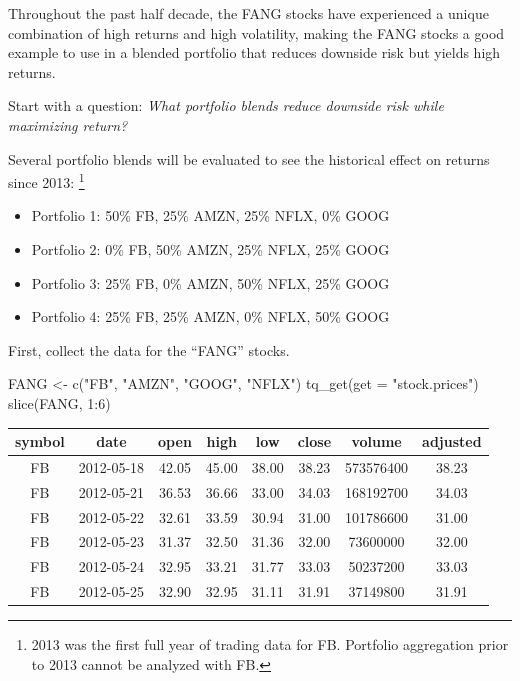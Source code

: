 Throughout the past half decade, the FANG stocks have experienced a
unique combination of high returns and high volatility, making the FANG
stocks a good example to use in a blended portfolio that reduces
downside risk but yields high returns.

Start with a question: \emph{What portfolio blends reduce downside risk
while maximizing return?}

Several portfolio blends will be evaluated to see the historical effect
on returns since 2013:
\footnote{2013 was the first full year of trading data for FB. Portfolio aggregation prior to 2013 cannot be analyzed with FB.}

\begin{itemize}
\tightlist
\item
  Portfolio 1: 50\% FB, 25\% AMZN, 25\% NFLX, 0\% GOOG
\item
  Portfolio 2: 0\% FB, 50\% AMZN, 25\% NFLX, 25\% GOOG
\item
  Portfolio 3: 25\% FB, 0\% AMZN, 50\% NFLX, 25\% GOOG
\item
  Portfolio 4: 25\% FB, 25\% AMZN, 0\% NFLX, 50\% GOOG
\end{itemize}

First, collect the data for the ``FANG'' stocks.

\begin{Schunk}
\begin{Sinput}
FANG <- c("FB", "AMZN", "GOOG", "NFLX") %
    tq_get(get = "stock.prices")
slice(FANG, 1:6)
\end{Sinput}
\end{Schunk}

\begin{tabular}{cccccccc}
\toprule
symbol & date & open & high & low & close & volume & adjusted\\
\midrule
FB & 2012-05-18 & 42.05 & 45.00 & 38.00 & 38.23 & 573576400 & 38.23\\
FB & 2012-05-21 & 36.53 & 36.66 & 33.00 & 34.03 & 168192700 & 34.03\\
FB & 2012-05-22 & 32.61 & 33.59 & 30.94 & 31.00 & 101786600 & 31.00\\
FB & 2012-05-23 & 31.37 & 32.50 & 31.36 & 32.00 & 73600000 & 32.00\\
FB & 2012-05-24 & 32.95 & 33.21 & 31.77 & 33.03 & 50237200 & 33.03\\
FB & 2012-05-25 & 32.90 & 32.95 & 31.11 & 31.91 & 37149800 & 31.91\\
\bottomrule
\end{tabular}

